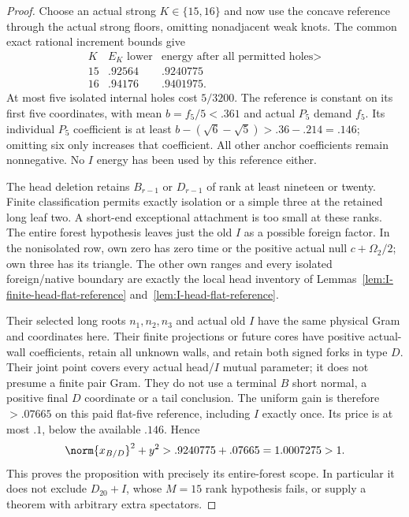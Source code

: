 \begin{proof}
Choose an actual strong $K\in\{15,16\}$ and now use the concave
reference through the actual strong floors, omitting nonadjacent
weak knots. The common exact rational increment bounds give
\[
\begin{array}{c|c|c}
K&E_K\text{ lower}&\text{energy after all permitted holes}>\\\hline
15&.92564&.9240775\\16&.94176&.9401975 .
\end{array}
\]
At most five isolated internal holes cost $5/3200$. The reference
is constant on its first five coordinates, with mean
$b=f_5/5<.361$ and actual $P_5$ demand $f_5$.
Its individual $P_5$ coefficient is at least
$b-(\sqrt6-\sqrt5)>.36-.214=.146$; omitting six only increases
that coefficient. All other anchor coefficients remain nonnegative.
No $I$ energy has been used by this reference either.

The head deletion retains $B_{r-1}$ or $D_{r-1}$ of rank at least
nineteen or twenty. Finite classification permits exactly isolation
or a simple three at the retained long leaf two. A short-end
exceptional attachment is too small at these ranks. The entire
forest hypothesis leaves just the old $I$ as a possible foreign
factor. In the nonisolated row, own zero has zero time or the
positive actual null $c+\Omega_2/2$; own three has its triangle.
The other own ranges and every isolated foreign/native boundary are
exactly the local head inventory of
Lemmas~\ref{lem:I-finite-head-flat-reference}
and~\ref{lem:I-head-flat-reference}.

Their selected long roots $n_1,n_2,n_3$ and actual old $I$ have
the same physical Gram and coordinates here. Their finite projections
or future cores have positive actual-wall coefficients, retain all
unknown walls, and retain both signed forks in type $D$. Their
joint point covers every actual head/$I$ mutual parameter; it does
not presume a finite pair Gram. They do not use a terminal $B$ short
normal, a positive final $D$ coordinate or a tail conclusion.
The uniform gain is therefore $>.07665$ on this paid flat-five
reference, including $I$ exactly once. Its price is at most $.1$,
below the available $.146$. Hence
\[
 \norm{x_{B/D}}^2+y^2>.9240775+.07665=1.0007275>1.
\]
This proves the proposition with precisely its entire-forest scope.
In particular it does not exclude $D_{20}+I$, whose $M=15$ rank
hypothesis fails, or supply a theorem with arbitrary extra spectators.
\end{proof}


